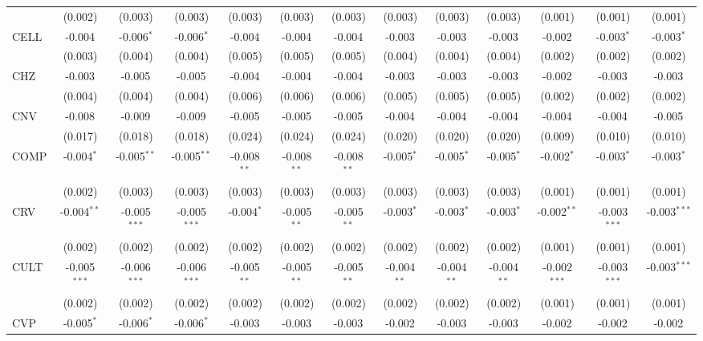 \begin{table}[!htbp]
\begin{tabular}{@{\extracolsep{5pt}}lcccccccccccc}
  & (0.002) & (0.003) & (0.003) & (0.003) & (0.003) & (0.003) & (0.003) & (0.003) & (0.003) & (0.001) & (0.001) & (0.001) \\
 CELL & -0.004$^{}$ & -0.006$^{*}$ & -0.006$^{*}$ & -0.004$^{}$ & -0.004$^{}$ & -0.004$^{}$ & -0.003$^{}$ & -0.003$^{}$ & -0.003$^{}$ & -0.002$^{}$ & -0.003$^{*}$ & -0.003$^{*}$ \\
  & (0.003) & (0.004) & (0.004) & (0.005) & (0.005) & (0.005) & (0.004) & (0.004) & (0.004) & (0.002) & (0.002) & (0.002) \\
 CHZ & -0.003$^{}$ & -0.005$^{}$ & -0.005$^{}$ & -0.004$^{}$ & -0.004$^{}$ & -0.004$^{}$ & -0.003$^{}$ & -0.003$^{}$ & -0.003$^{}$ & -0.002$^{}$ & -0.003$^{}$ & -0.003$^{}$ \\
  & (0.004) & (0.004) & (0.004) & (0.006) & (0.006) & (0.006) & (0.005) & (0.005) & (0.005) & (0.002) & (0.002) & (0.002) \\
 CNV & -0.008$^{}$ & -0.009$^{}$ & -0.009$^{}$ & -0.005$^{}$ & -0.005$^{}$ & -0.005$^{}$ & -0.004$^{}$ & -0.004$^{}$ & -0.004$^{}$ & -0.004$^{}$ & -0.004$^{}$ & -0.005$^{}$ \\
  & (0.017) & (0.018) & (0.018) & (0.024) & (0.024) & (0.024) & (0.020) & (0.020) & (0.020) & (0.009) & (0.010) & (0.010) \\
 COMP & -0.004$^{*}$ & -0.005$^{**}$ & -0.005$^{**}$ & -0.008$^{**}$ & -0.008$^{**}$ & -0.008$^{**}$ & -0.005$^{*}$ & -0.005$^{*}$ & -0.005$^{*}$ & -0.002$^{*}$ & -0.003$^{*}$ & -0.003$^{*}$ \\
  & (0.002) & (0.003) & (0.003) & (0.003) & (0.003) & (0.003) & (0.003) & (0.003) & (0.003) & (0.001) & (0.001) & (0.001) \\
 CRV & -0.004$^{**}$ & -0.005$^{***}$ & -0.005$^{***}$ & -0.004$^{*}$ & -0.005$^{**}$ & -0.005$^{**}$ & -0.003$^{*}$ & -0.003$^{*}$ & -0.003$^{*}$ & -0.002$^{**}$ & -0.003$^{***}$ & -0.003$^{***}$ \\
  & (0.002) & (0.002) & (0.002) & (0.002) & (0.002) & (0.002) & (0.002) & (0.002) & (0.002) & (0.001) & (0.001) & (0.001) \\
 CULT & -0.005$^{***}$ & -0.006$^{***}$ & -0.006$^{***}$ & -0.005$^{**}$ & -0.005$^{**}$ & -0.005$^{**}$ & -0.004$^{**}$ & -0.004$^{**}$ & -0.004$^{**}$ & -0.002$^{***}$ & -0.003$^{***}$ & -0.003$^{***}$ \\
  & (0.002) & (0.002) & (0.002) & (0.002) & (0.002) & (0.002) & (0.002) & (0.002) & (0.002) & (0.001) & (0.001) & (0.001) \\
 CVP & -0.005$^{*}$ & -0.006$^{*}$ & -0.006$^{*}$ & -0.003$^{}$ & -0.003$^{}$ & -0.003$^{}$ & -0.002$^{}$ & -0.003$^{}$ & -0.003$^{}$ & -0.002$^{}$ & -0.002$^{}$ & -0.002$^{}$ \\

\end{tabular}
\end{table}
